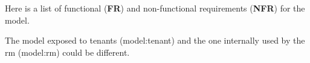 Here is a list of functional (\textbf{FR}) and non-functional requirements (\textbf{NFR}) for the \gls{model}.

The model exposed to tenants (\gls{model:tenant}) and the one internally used by the \gls{rm} (\gls{model:rm}) could be different.
